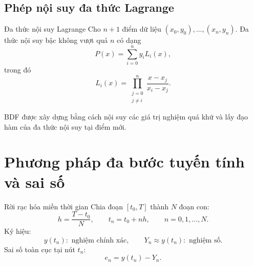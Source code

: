 \documentclass[aspectratio=43]{beamer}
\newcommand{\abs}[1]{\left| #1 \right|}
\begin{document}
\subsection*{Phép nội suy đa thức Lagrange}
\begin{frame}
\begin{baitapbox}{Đa thức nội suy Lagrange}
Cho $n+1$ điểm dữ liệu $(x_0,y_0),\ldots,(x_n,y_n)$. Đa thức nội suy bậc không vượt quá $n$ có dạng
\[
 P(x)=\sum_{i=0}^{n} y_i L_i(x),
\]
trong đó
\[
 L_i(x)=\prod_{\substack{j=0\\j\ne i}}^{n}\frac{x-x_j}{x_i-x_j}.
\]
\end{baitapbox}
\begin{tcolorbox}[title={Liên hệ với BDF}, colback=softgreen, colframe=tealgreen, colbacktitle=tealgreen]
BDF được xây dựng bằng cách nội suy các giá trị nghiệm quá khứ và lấy đạo hàm của đa thức nội suy tại điểm mới.
\end{tcolorbox}
\end{frame}

\section{Phương pháp đa bước tuyến tính và sai số}

\begin{frame}
\begin{baitapbox}{Rời rạc hóa miền thời gian}
Chia đoạn $[t_0,T]$ thành $N$ đoạn con:
\[
 h=\frac{T-t_0}{N},\qquad t_n=t_0+nh,\qquad n=0,1,\ldots,N.
\]
Ký hiệu:
\[
 y(t_n): \text{ nghiệm chính xác},\qquad Y_n\approx y(t_n): \text{ nghiệm số}.
\]
Sai số toàn cục tại nút $t_n$:
\[
 e_n=y(t_n)-Y_n.
\]
\end{baitapbox}
\end{frame}
\end{document}
